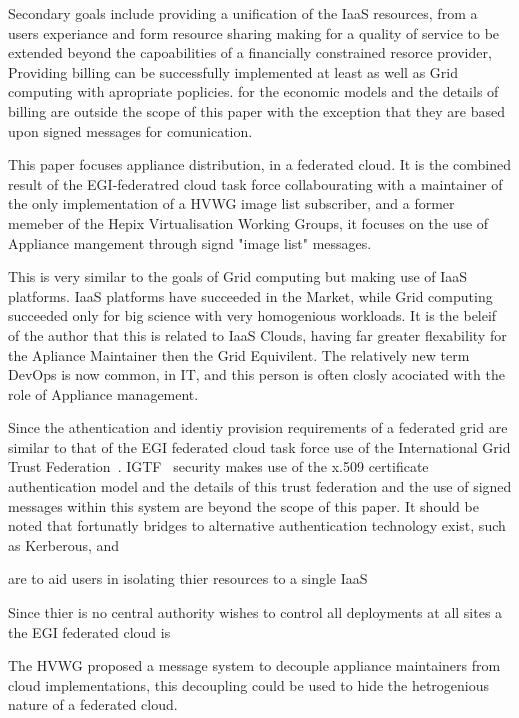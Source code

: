 \documentclass{llncs_Ibergrid2013}
\begin{document}
Secondary goals include providing a unification of the IaaS resources, from a users experiance and form resource sharing making for a quality of service to be extended beyond the capoabilities of a financially constrained resorce provider, Providing billing can be successfully implemented at least as well as Grid computing with apropriate poplicies. for the economic models and the details of billing are outside the scope of this paper with the exception that they are based upon signed messages for comunication.

This paper focuses appliance distribution, in a federated cloud. It is the combined result of the EGI-federatred cloud task force collabourating with a maintainer of the only implementation of a HVWG image list subscriber, and a former memeber of the Hepix Virtualisation Working Groups, it focuses on the use of Appliance mangement through signd "image list" messages.

This is very similar to the goals of Grid computing but making use of IaaS platforms. IaaS platforms have succeeded in the Market, while Grid computing succeeded only for big science with very homogenious workloads. It is the beleif of the author that this is related to IaaS Clouds, having far greater flexability for the Apliance Maintainer then the Grid Equivilent. The relatively new term DevOps is now common, in IT, and this person is often closly acociated with the role of Appliance management.

Since the athentication and identiy provision requirements of a federated grid are similar to that of the EGI federated cloud task force use of the International Grid Trust Federation~\cite{igtf}. IGTF~\cite{igtf} security makes use of the x.509 certificate authentication model and the details of this trust federation and the use of signed messages within this system are beyond the scope of this paper. It should be noted that fortunatly bridges to alternative authentication technology exist, such as Kerberous, and 





are to aid users in isolating thier resources to a single IaaS

Since thier is no central authority wishes to control all deployments at all sites a the EGI federated cloud is 

The HVWG proposed a message system to decouple appliance maintainers from cloud implementations, this decoupling could be used to hide the hetrogenious nature of a federated cloud.
\end{document}
